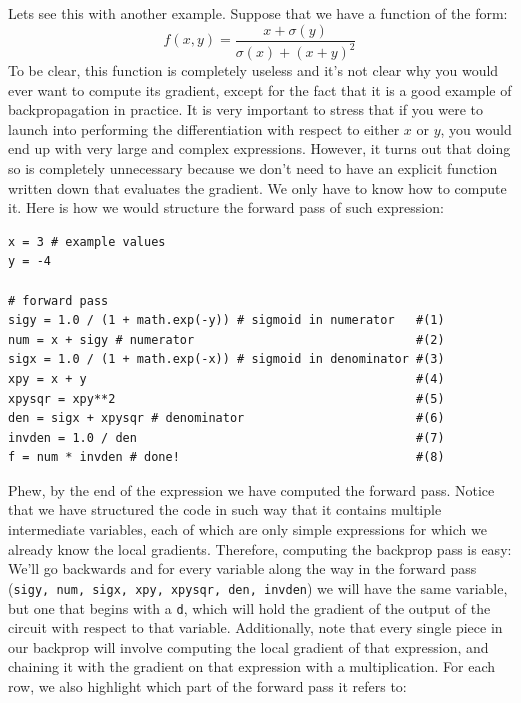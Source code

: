 Lets see this with another example. Suppose that we have a function of the form:
\begin{equation}
f(x,y) = \frac{x + \sigma(y)}{\sigma(x) + (x+y)^2}
\end{equation}
To be clear, this function is completely useless and it’s not clear why you would ever want to compute its gradient, except for the fact that it is a good example of backpropagation in practice. It is very important to stress that if you were to launch into performing the differentiation with respect to either $x$ or $y$, you would end up with very large and complex expressions. However, it turns out that doing so is completely unnecessary because we don’t need to have an explicit function written down that evaluates the gradient. We only have to know how to compute it. Here is how we would structure the forward pass of such expression:

\begin{lstlisting}[frame=single]
x = 3 # example values
y = -4

# forward pass
sigy = 1.0 / (1 + math.exp(-y)) # sigmoid in numerator   #(1)
num = x + sigy # numerator                               #(2)
sigx = 1.0 / (1 + math.exp(-x)) # sigmoid in denominator #(3)
xpy = x + y                                              #(4)
xpysqr = xpy**2                                          #(5)
den = sigx + xpysqr # denominator                        #(6)
invden = 1.0 / den                                       #(7)
f = num * invden # done!                                 #(8)
\end{lstlisting}

Phew, by the end of the expression we have computed the forward pass. Notice that we have structured the code in such way that it contains multiple intermediate variables, each of which are only simple expressions for which we already know the local gradients. Therefore, computing the backprop pass is easy: We’ll go backwards and for every variable along the way in the forward pass (\texttt{sigy, num, sigx, xpy, xpysqr, den, invden}) we will have the same variable, but one that begins with a \texttt{d}, which will hold the gradient of the output of the circuit with respect to that variable. Additionally, note that every single piece in our backprop will involve computing the local gradient of that expression, and chaining it with the gradient on that expression with a multiplication. For each row, we also highlight which part of the forward pass it refers to:

